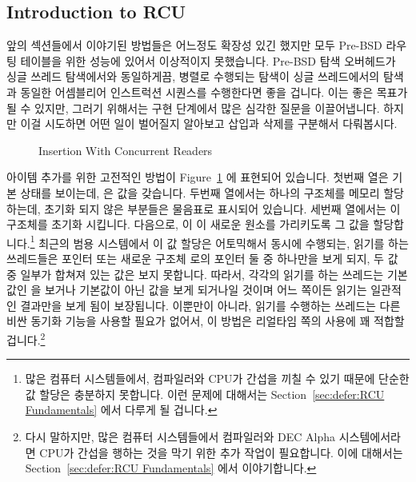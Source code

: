 
\subsection{Introduction to RCU}
\label{sec:defer:Introduction to RCU}

앞의 섹션들에서 이야기된 방법들은 어느정도 확장성 있긴 했지만 모두 Pre-BSD
라우팅 테이블을 위한 성능에 있어서 이상적이지 못했습니다.
Pre-BSD 탐색 오버헤드가 싱글 쓰레드 탐색에서와 동일하게끔, 병렬로 수행되는
탐색이 싱글 쓰레드에서의 탐색과 동일한 어셈블리어 인스트럭션 시퀀스를
수행한다면 좋을 겁니다.
이는 좋은 목표가 될 수 있지만, 그러기 위해서는 구현 단계에서 많은 심각한 질문을
이끌어냅니다.
하지만 이걸 시도하면 어떤 일이 벌어질지 알아보고 삽입과 삭제를 구분해서
다뤄봅시다.
\iffalse

The approaches discussed in the preceding sections have provided
some scalability but decidedly non-ideal performance for the
Pre-BSD routing table.
It would be nice if the overhead of Pre-BSD lookups was the same as
that of a single-threaded lookup, so that the parallel lookups would
execute the same sequence of assembly language instructions as would a
single-threaded lookup.
Although this is a nice goal, it does raise some serious implementability
questions.
But let's see what happens if we try, treating insertion and deletion
separately.
\fi

\begin{figure}[tb]
\begin{center}
\end{center}
\caption{Insertion With Concurrent Readers}
\label{fig:defer:Insertion With Concurrent Readers}
\end{figure}

아이템 추가를 위한 고전적인 방법이
Figure~\ref{fig:defer:Insertion With Concurrent Readers} 에 표현되어 있습니다.
첫번째 열은 기본 상태를 보이는데,  은  값을 갖습니다.
두번째 열에서는 하나의 구조체를 메모리 할당하는데, 초기화 되지 않은 부분들은
물음표로 표시되어 있습니다.
세번째 열에서는 이 구조체를 초기화 시킵니다.
다음으로,  이 이 새로운 원소를 가리키도록 그 값을
할당합니다.\footnote{
	많은 컴퓨터 시스템들에서, 컴파일러와 CPU가 간섭을 끼칠 수 있기 때문에
	단순한 값 할당은 충분하지 못합니다.
	이런 문제에 대해서는 Section~\ref{sec:defer:RCU Fundamentals} 에서
	다루게 될 겁니다.}
최근의 범용 시스템에서 이 값 할당은 어토믹해서 동시에 수행되는, 읽기를 하는
쓰레드들은  포인터 또는 새로운 구조체  로의 포인터 둘 중
하나만을 보게 되지, 두 값 중 일부가 합쳐져 있는 값은 보지 못합니다.
따라서, 각각의 읽기를 하는 쓰레드는 기본값인  을 보거나
기본값이 아닌 값을 보게 되거나일 것이며 어느 쪽이든 읽기는 일관적인 결과만을
보게 됨이 보장됩니다.
이뿐만이 아니라, 읽기를 수행하는 쓰레드는 다른 비싼 동기화 기능을 사용할 필요가
없어서, 이 방법은 리얼타임 쪽의 사용에 꽤 적합할 겁니다.\footnote{
	다시 말하지만, 많은 컴퓨터 시스템들에서 컴파일러와 DEC Alpha
	시스템에서라면 CPU가 간섭을 행하는 것을 막기 위한 추가 작업이
	필요합니다.
	이에 대해서는 Section~\ref{sec:defer:RCU Fundamentals} 에서
	이야기합니다.}
\iffalse

